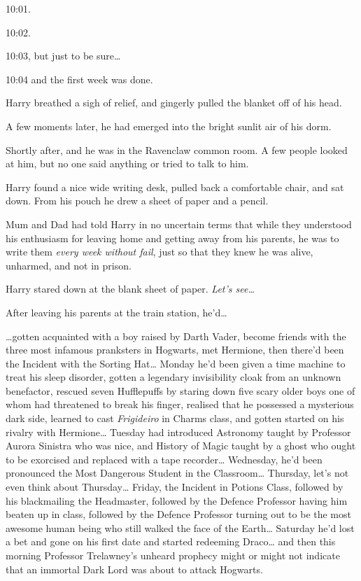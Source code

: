 10:01.

10:02.

10:03, but just to be sure\ldots{}

10:04 and the first week was done.

Harry breathed a sigh of relief, and gingerly pulled the blanket off of
his head.

A few moments later, he had emerged into the bright sunlit air of his
dorm.

Shortly after, and he was in the Ravenclaw common room. A few people
looked at him, but no one said anything or tried to talk to him.

Harry found a nice wide writing desk, pulled back a comfortable chair,
and sat down. From his pouch he drew a sheet of paper and a pencil.

Mum and Dad had told Harry in no uncertain terms that while they
understood his enthusiasm for leaving home and getting away from his
parents, he was to write them \emph{every week without fail}, just so
that they knew he was alive, unharmed, and not in prison.

Harry stared down at the blank sheet of paper. \emph{Let's see\ldots{}}

After leaving his parents at the train station, he'd\ldots{}

\ldots{}gotten acquainted with a boy raised by Darth Vader, become
friends with the three most infamous pranksters in Hogwarts, met
Hermione, then there'd been the Incident with the Sorting Hat\ldots{}
Monday he'd been given a time machine to treat his sleep disorder,
gotten a legendary invisibility cloak from an unknown benefactor,
rescued seven Hufflepuffs by staring down five scary older boys one of
whom had threatened to break his finger, realised that he possessed a
mysterious dark side, learned to cast \emph{Frigideiro} in Charms class,
and gotten started on his rivalry with Hermione\ldots{} Tuesday had
introduced Astronomy taught by Professor Aurora Sinistra who was nice,
and History of Magic taught by a ghost who ought to be exorcised and
replaced with a tape recorder\ldots{} Wednesday, he'd been pronounced
the Most Dangerous Student in the Classroom\ldots{} Thursday, let's not
even think about Thursday\ldots{} Friday, the Incident in Potions Class,
followed by his blackmailing the Headmaster, followed by the Defence
Professor having him beaten up in class, followed by the Defence
Professor turning out to be the most awesome human being who still
walked the face of the Earth\ldots{} Saturday he'd lost a bet and gone
on his first date and started redeeming Draco\ldots{} and then this
morning Professor Trelawney's unheard prophecy might or might not
indicate that an immortal Dark Lord was about to attack Hogwarts.

